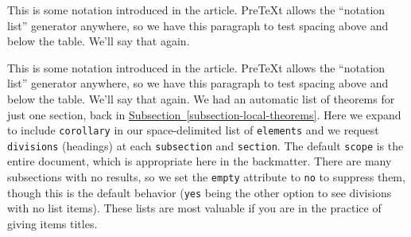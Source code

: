 \documentclass{amsart}
\theoremstyle{plain}%
\theoremstyle{definition}%
\theoremstyle{remark}%
\newcommand{\xreffont}{\relax}
\newcommand{\mono}[1]{\texttt{#1}}
\numberwithin{equation}{section}
\begin{document}
This is some notation introduced in the article.  PreTeXt allows the ``notation list'' generator anywhere, so we have this paragraph to test spacing above and below the table.  We'll say that again.%
\par
This is some notation introduced in the article.  PreTeXt allows the ``notation list'' generator anywhere, so we have this paragraph to test spacing above and below the table.  We'll say that again.%
%
%
\typeout{************************************************}
\typeout{************************************************}
%
\label{appendix-results}%
We had an automatic list of theorems for just one section, back in \hyperref[subsection-local-theorems]{Subsection~{\xreffont\ref{subsection-local-theorems}}}.  Here we expand to include \mono{corollary} in our space-delimited list of \mono{elements} and we request \mono{divisions} (headings) at each \mono{subsection} and \mono{section}.  The default \mono{scope} is the entire document, which is appropriate here in the backmatter.  There are many subsections with no results, so we set the \mono{empty} attribute to \mono{no} to suppress them, though this is the default behavior (\mono{yes} being the other option to see divisions with no list items).  These lists are most valuable if you are in the practice of giving items titles.%
\noindent
\end{document}
